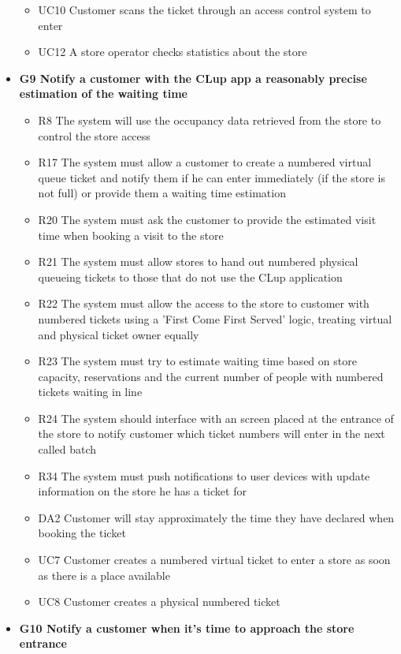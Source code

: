 \begin{itemize}
\begin{itemize}
        \medskip
        \item UC10 Customer scans the ticket through an access control system to enter
        \item UC12 A store operator checks statistics about the store
    \end{itemize}     
    \item \textbf{G9 Notify a customer with the CLup app a reasonably precise estimation of the waiting time}
    \begin{itemize}
        \item R8 The system will use the occupancy data retrieved from the store to control the store access
        \item R17 The system must allow a customer to create a numbered virtual queue ticket and notify them if he can enter immediately (if the store is not full) or provide them a waiting time estimation
        \item R20 The system must ask the customer to provide the estimated visit time when booking a visit to the store
        \item R21 The system must allow stores to hand out numbered physical queueing tickets to those that do not use the CLup application
        \item R22 The system must allow the access to the store to customer with numbered tickets using a ’First Come First Served’ logic, treating virtual and physical ticket owner equally
        \item R23 The system must try to estimate waiting time based on store capacity, reservations and the current number of people with numbered tickets waiting in line
        \item R24 The system should interface with an screen placed at the entrance of the store to notify customer which ticket numbers will enter in the next called batch
        \item R34 The system must push notifications to user devices with update information on the store he has a ticket for
        \medskip
        \item DA2 Customer will stay approximately the time they have declared when booking the ticket
        \medskip
        \item UC7 Customer creates a numbered virtual ticket to enter a store as soon as there is a place available
        \item UC8 Customer creates a physical numbered ticket
    \end{itemize}
    \item \textbf{G10 Notify a customer when it's time to approach the store entrance}

\end{itemize}

